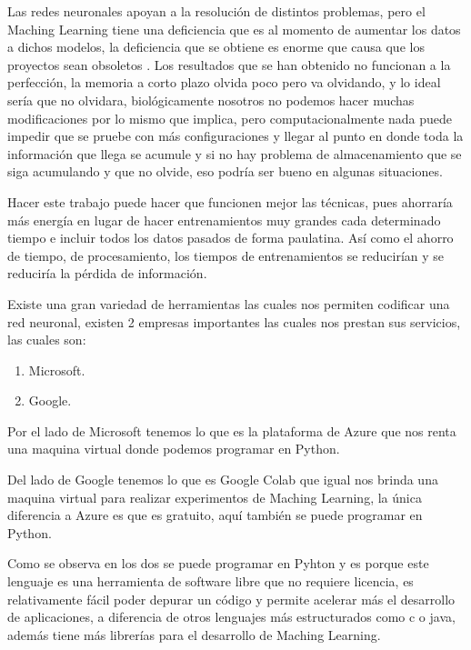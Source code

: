         Las redes neuronales apoyan a la resoluci\'on de distintos problemas, pero el Maching Learning 
        tiene una deficiencia que es al momento de aumentar los datos a dichos modelos, la deficiencia 
        que se obtiene es enorme que causa que los proyectos sean obsoletos \cite{Bullinaria2009}. Los 
        resultados que se han obtenido no funcionan a la perfección, la memoria a corto plazo olvida poco 
        pero va olvidando, y lo ideal sería que no olvidara, biológicamente nosotros no podemos 
        hacer muchas modificaciones por lo mismo que implica, pero computacionalmente nada puede 
        impedir que se pruebe con más configuraciones y llegar al punto en donde toda la información 
        que llega se acumule y si no hay problema de almacenamiento que se siga acumulando y que no olvide, 
        eso podría ser bueno en algunas situaciones.

        Hacer este trabajo puede hacer que funcionen mejor las técnicas, pues ahorraría más energía 
        en lugar de hacer entrenamientos muy grandes cada determinado tiempo e incluir todos los datos 
        pasados de forma paulatina. Así como el ahorro de tiempo, de procesamiento, los tiempos de 
        entrenamientos se reducirían y se reduciría la pérdida de información.

        Existe una gran variedad de herramientas las cuales nos permiten codificar una red neuronal, existen 2 empresas 
        importantes las cuales nos prestan sus servicios, las cuales son:
        \begin{enumerate}
            \item Microsoft.
            \item Google.
        \end{enumerate}
        Por el lado de Microsoft tenemos lo que es la plataforma de Azure que nos renta una maquina virtual donde podemos 
        programar en Python.

        Del lado de Google tenemos lo que es Google Colab que igual nos brinda una maquina virtual para realizar experimentos de Maching
        Learning, la \'unica diferencia a Azure es que es gratuito, aqu\'i también se puede programar en Python.

        Como se observa en los dos se puede programar en Pyhton y es porque este lenguaje es una herramienta de 
        software libre que no requiere licencia, es relativamente fácil poder depurar un código y permite acelerar 
        más el desarrollo de aplicaciones,  a diferencia de otros lenguajes más estructurados 
        como c o java, adem\'as tiene m\'as librerías para el desarrollo de Maching Learning. \\

